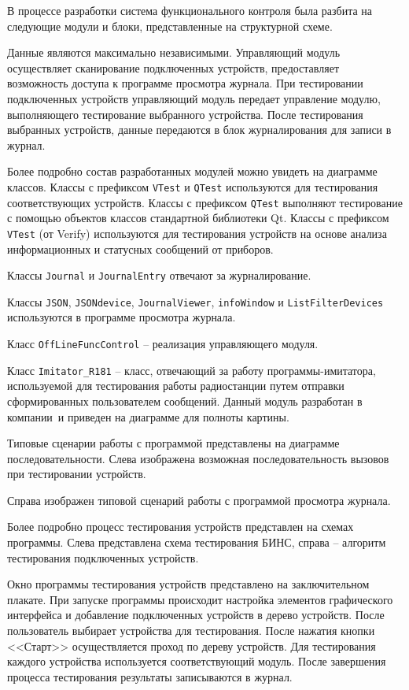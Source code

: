 В процессе разработки система  функционального контроля была разбита на следующие модули и блоки, представленные на
структурной схеме.

Данные являются максимально независимыми. Управляющий модуль осуществляет сканирование подключенных устройств,
предоставляет возможность доступа к программе просмотра журнала. При тестировании подключенных устройств управляющий
модуль передает управление модулю, выполняющего тестирование выбранного устройства. После тестирования выбранных
устройств, данные передаются в блок журналирования для записи в журнал.

Более подробно состав разработанных модулей можно увидеть на диаграмме классов.
Классы с префиксом \texttt{VTest} и \texttt{QTest} используются для тестирования соответствующих устройств.
Классы с префиксом \texttt{QTest} выполняют тестирование с помощью объектов классов стандартной библиотеки Qt.
Классы с префиксом \texttt{VTest} (от Verify) используются для тестирования устройств на основе анализа информационных и
статусных сообщений от приборов.

Классы \texttt{Journal} и \texttt{JournalEntry} отвечают за журналирование.

Классы \texttt{JSON}, \texttt{JSONdevice}, \texttt{JournalViewer}, \texttt{infoWindow} и \texttt{ListFilterDevices}
используются в программе просмотра журнала.

Класс \texttt{OffLineFuncControl} -- реализация управляющего модуля.

Класс \texttt{Imitator\_R181} -- класс, отвечающий за работу программы-имитатора, используемой для тестирования работы
радиостанции путем отправки сформированных пользователем сообщений. Данный модуль разработан в компании~\company и
приведен на диаграмме для полноты картины.

Типовые сценарии работы с программой представлены на диаграмме последовательности. Слева изображена возможная
последовательность вызовов при тестировании устройств.

Справа изображен типовой сценарий работы с программой просмотра журнала.

Более подробно процесс тестирования устройств представлен на схемах программы.
Слева представлена схема тестирования БИНС, справа -- алгоритм тестирования подключенных устройств.

Окно программы тестирования устройств представлено на заключительном плакате. При запуске программы происходит настройка
элементов графического интерфейса и добавление подключенных устройств в дерево устройств. После пользователь выбирает
устройства для тестирования. После нажатия кнопки <<Старт>> осуществляется проход по дереву устройств. Для тестирования
каждого устройства используется соответствующий модуль. После завершения процесса тестирования результаты записываются в
журнал.

